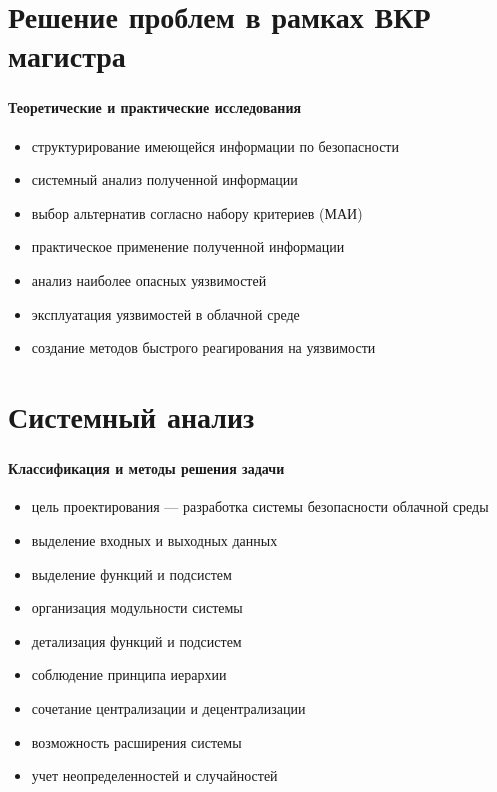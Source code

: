 
\section{Решение проблем в рамках ВКР магистра}

\begin{frame}
\frametitle{\insertsection}
\framesubtitle{Теоретические и практические исследования}

\begin{itemize}
    \item структурирование имеющейся информации по безопасности
    \item системный анализ полученной информации
    \item выбор альтернатив согласно набору критериев (МАИ)
    \item практическое применение полученной информации
    \item анализ наиболее опасных уязвимостей
    \item эксплуатация уязвимостей в облачной среде
    \item создание методов быстрого реагирования на уязвимости
\end{itemize}
\end{frame}


\section{Системный анализ}

\begin{frame}
\frametitle{\insertsection}
\framesubtitle{Классификация и методы решения задачи}

\begin{itemize}
    \item цель проектирования --- разработка системы безопасности облачной среды
    \item выделение входных и выходных данных
    \item выделение функций и подсистем
    \item организация модульности системы
    \item детализация функций и подсистем
    \item соблюдение принципа иерархии
    \item сочетание централизации и децентрализации
    \item возможность расширения системы
    \item учет неопределенностей и случайностей
\end{itemize}
\end{frame}

